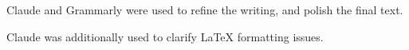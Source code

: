 \begin{AIDcomment}
Claude and Grammarly were used to refine the writing, and polish the final text.
\end{AIDcomment}

\begin{AIDcomment}
Claude was additionally used to clarify LaTeX formatting issues.
\end{AIDcomment}




